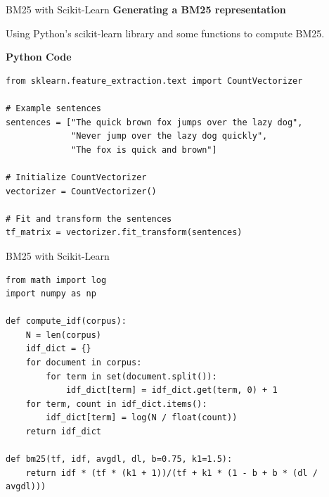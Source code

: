 \documentclass{beamer}
\begin{document}
\begin{frame}[fragile]{BM25 with Scikit-Learn}
\small
\textbf{Generating a BM25 representation}

Using Python's scikit-learn library and some functions to compute BM25.

\textbf{Python Code}

\begin{tcolorbox}[colback=lightgray, colframe=lightgray,
                  boxsep=0mm, arc=1mm, boxrule=0mm,
                  left=1mm, right=1mm, top=1mm, bottom=1mm]
\begin{Verbatim}[fontsize=\scriptsize, bgcolor=lightgray]
from sklearn.feature_extraction.text import CountVectorizer

# Example sentences
sentences = ["The quick brown fox jumps over the lazy dog",
             "Never jump over the lazy dog quickly",
             "The fox is quick and brown"]

# Initialize CountVectorizer
vectorizer = CountVectorizer()

# Fit and transform the sentences
tf_matrix = vectorizer.fit_transform(sentences)
\end{Verbatim}
\end{tcolorbox}

\end{frame}

\begin{frame}[fragile]{BM25 with Scikit-Learn}
\small
\begin{tcolorbox}[colback=lightgray, colframe=lightgray,
                  boxsep=0mm, arc=1mm, boxrule=0mm,
                  left=1mm, right=1mm, top=1mm, bottom=1mm]
\begin{Verbatim}[fontsize=\scriptsize, bgcolor=lightgray]
from math import log
import numpy as np

def compute_idf(corpus):
    N = len(corpus)
    idf_dict = {}
    for document in corpus:
        for term in set(document.split()):
            idf_dict[term] = idf_dict.get(term, 0) + 1
    for term, count in idf_dict.items():
        idf_dict[term] = log(N / float(count))
    return idf_dict

def bm25(tf, idf, avgdl, dl, b=0.75, k1=1.5):
    return idf * (tf * (k1 + 1))/(tf + k1 * (1 - b + b * (dl / avgdl)))
\end{Verbatim}
\end{tcolorbox}

\end{frame}
\end{document}
